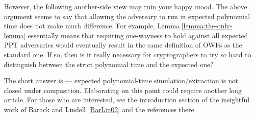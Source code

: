 \documentclass{article}
\begin{document}
However, the following another-side view may ruin your happy mood. The above argument seems to say that allowing the adversary to run in expected polynomial time does not make much difference. For example, Lemma \ref{lemma:the-only-lemma} essentially means that requiring one-wayness to hold against all expected PPT adversaries would eventually result in the same definition of OWFs as the standard one. If so, then is it really necessary for cryptographers to try so hard to distinguish between the strict polynomial time and the expected one? 

The short answer is --- expected polynomial-time simulation/extraction is not closed under composition. Elaborating on this point could require another long article. For those who are interested, see the introduction section of the insightful work of Barack and Lindell [\href{https://eprint.iacr.org/2002/043}{BarLin02}] and the references there.


\end{document}
